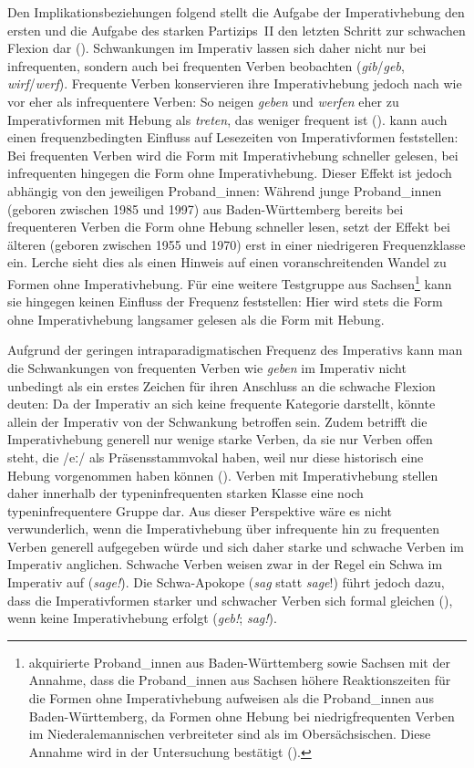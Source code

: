 Den Implikationsbeziehungen folgend stellt die Aufgabe der Imperativhebung den ersten und die Aufgabe des starken Partizips~II den letzten Schritt zur schwachen Flexion dar (\cite[182--183]{Nowak.2013}). Schwankungen im Imperativ lassen sich daher nicht nur bei infrequenten, sondern auch bei frequenten Verben beobachten (\textit{gib}/\textit{geb}, \textit{wirf}/\textit{werf}). Frequente Verben konservieren ihre Imperativhebung jedoch nach wie vor eher als infrequentere Verben: So neigen \textit{geben} und \textit{werfen} eher zu Imperativformen mit Hebung als \textit{treten}, das weniger frequent ist (\cite[124--125]{Krause.2016}). \textcite[160--162]{Krause.2016} kann auch einen frequenzbedingten Einfluss auf Lesezeiten von Imperativformen feststellen: Bei frequenten Verben wird die Form mit Imperativhebung schneller gelesen, bei infrequenten hingegen die Form ohne Imperativhebung. Dieser Effekt ist jedoch abhängig von den jeweiligen Proband\_innen: Während junge Proband\_innen (geboren zwischen 1985 und 1997) aus Baden-Württemberg bereits bei frequenteren Verben die Form ohne Hebung schneller lesen, setzt der Effekt bei älteren (geboren zwischen 1955 und 1970) erst in einer niedrigeren Frequenzklasse ein. Lerche sieht dies als einen Hinweis auf einen voranschreitenden Wandel zu Formen ohne Imperativhebung. Für eine weitere Testgruppe aus Sachsen\footnote{\textcite[132--133]{Krause.2016} akquirierte Proband\_innen aus Baden-Württemberg sowie Sachsen mit der Annahme, dass die Proband\_innen aus Sachsen höhere Reaktionszeiten für die Formen ohne Imperativhebung aufweisen als die Proband\_innen aus Baden-Württemberg, da Formen ohne Hebung bei niedrigfrequenten Verben im Niederalemannischen verbreiteter sind als im Obersächsischen. Diese Annahme wird in der Untersuchung bestätigt (\cite[142--143]{Krause.2016}).} kann sie hingegen keinen Einfluss der Frequenz feststellen: Hier wird stets die Form ohne Imperativhebung langsamer gelesen als die Form mit Hebung.



Aufgrund der geringen intraparadigmatischen Frequenz des Imperativs kann man die Schwankungen von frequenten Verben wie \textit{geben} im Imperativ nicht unbedingt als ein erstes Zeichen für ihren Anschluss an die schwache Flexion deuten: Da der Imperativ an sich keine frequente Kategorie darstellt, könnte allein der Imperativ von der Schwankung betroffen sein. Zudem betrifft die Imperativhebung generell nur wenige starke Verben, da sie  nur Verben offen steht, die /eː/ als Präsensstammvokal haben, weil nur diese historisch eine Hebung vorgenommen haben können (\cite[365]{Braune.2018}). Verben mit Imperativhebung stellen daher innerhalb der  typeninfrequenten starken Klasse eine noch typeninfrequentere Gruppe dar. Aus dieser Perspektive wäre es nicht verwunderlich, wenn die Imperativhebung über infrequente hin zu frequenten Verben generell aufgegeben würde und sich daher starke und schwache Verben im Imperativ anglichen. Schwache Verben weisen zwar in der Regel ein Schwa im Imperativ auf (\textit{sage!}). Die Schwa-Apokope (\textit{sag} statt \textit{sage}!) führt jedoch dazu, dass die Imperativformen starker und schwacher Verben sich formal gleichen (\cite[99--101]{Dammel.2011}), wenn keine Imperativhebung erfolgt (\textit{geb!}; \textit{sag!}). 

